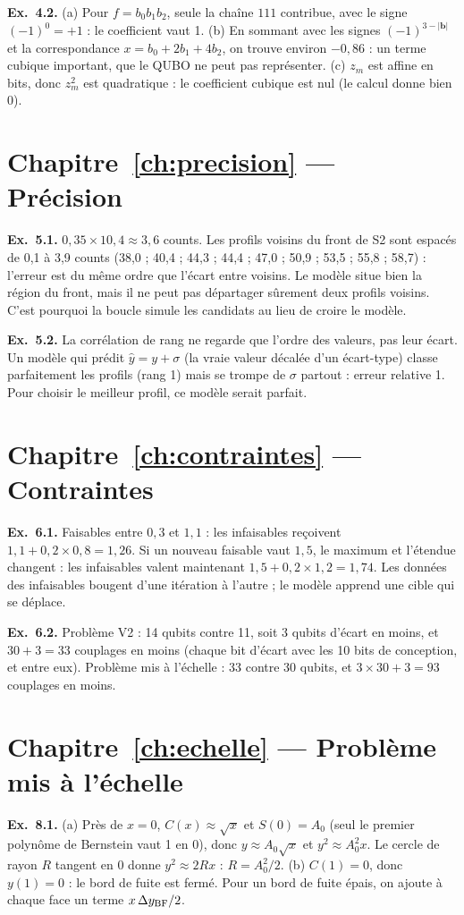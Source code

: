 \textbf{Ex.~4.2.} (a) Pour $f=b_0b_1b_2$, seule la chaîne $111$ contribue, avec le signe $(-1)^0=+1$ : le coefficient vaut 1. (b) En sommant avec les signes $(-1)^{3-|\mathbf b|}$ et la correspondance $x=b_0+2b_1+4b_2$, on trouve environ $-0{,}86$ : un terme cubique important, que le QUBO ne peut pas représenter. (c) $z_m$ est affine en bits, donc $z_m^2$ est quadratique : le coefficient cubique est nul (le calcul donne bien 0).

\section*{Chapitre~\ref{ch:precision} — Précision}
\textbf{Ex.~5.1.} $0{,}35\times10{,}4\approx3{,}6$ counts. Les profils voisins du front de S2 sont espacés de 0,1 à 3,9 counts (38,0 ; 40,4 ; 44,3 ; 44,4 ; 47,0 ; 50,9 ; 53,5 ; 55,8 ; 58,7) : l'erreur est du même ordre que l'écart entre voisins. Le modèle situe bien la région du front, mais il ne peut pas départager sûrement deux profils voisins. C'est pourquoi la boucle simule les candidats au lieu de croire le modèle.

\textbf{Ex.~5.2.} La corrélation de rang ne regarde que l'ordre des valeurs, pas leur écart. Un modèle qui prédit $\hat y=y+\sigma$ (la vraie valeur décalée d'un écart-type) classe parfaitement les profils (rang 1) mais se trompe de $\sigma$ partout : erreur relative 1. Pour choisir le meilleur profil, ce modèle serait parfait.

\section*{Chapitre~\ref{ch:contraintes} — Contraintes}
\textbf{Ex.~6.1.} Faisables entre $0{,}3$ et $1{,}1$ : les infaisables reçoivent $1{,}1+0{,}2\times0{,}8=1{,}26$. Si un nouveau faisable vaut $1{,}5$, le maximum et l'étendue changent : les infaisables valent maintenant $1{,}5+0{,}2\times1{,}2=1{,}74$. Les données des infaisables bougent d'une itération à l'autre ; le modèle apprend une cible qui se déplace.

\textbf{Ex.~6.2.} Problème V2 : 14 qubits contre 11, soit 3 qubits d'écart en moins, et $30+3=33$ couplages en moins (chaque bit d'écart avec les 10 bits de conception, et entre eux). Problème mis à l'échelle : 33 contre 30 qubits, et $3\times30+3=93$ couplages en moins.

\section*{Chapitre~\ref{ch:echelle} — Problème mis à l'échelle}
\textbf{Ex.~8.1.} (a) Près de $x=0$, $C(x)\approx\sqrt x$ et $S(0)=A_0$ (seul le premier polynôme de Bernstein vaut 1 en 0), donc $y\approx A_0\sqrt x$ et $y^2\approx A_0^2x$. Le cercle de rayon $R$ tangent en 0 donne $y^2\approx2Rx$ : $R=A_0^2/2$. (b) $C(1)=0$, donc $y(1)=0$ : le bord de fuite est fermé. Pour un bord de fuite épais, on ajoute à chaque face un terme $x\,\Delta y_{\rm BF}/2$.


